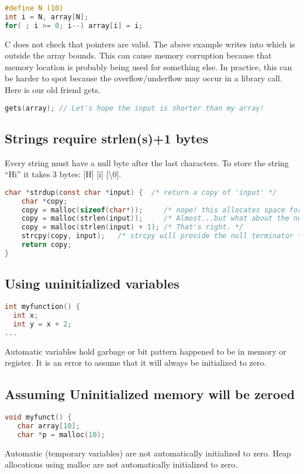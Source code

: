 \begin{lstlisting}[language=C]
#define N (10)
int i = N, array[N];
for( ; i >= 0; i--) array[i] = i;
\end{lstlisting}

C does not check that pointers are valid.
The above example writes into  which is outside the array bounds.
This can cause memory corruption because that memory location is probably being used for something else.
In practice, this can be harder to spot because the overflow/underflow may occur in a library call.
Here is our old friend gets.

\begin{lstlisting}[language=C]
gets(array); // Let's hope the input is shorter than my array!
\end{lstlisting}


\subsection{Strings require strlen(s)+1 bytes}

Every string must have a null byte after the last characters.
To store the string ``Hi'' it takes 3 bytes: [H] [i] [\backslash 0].

\begin{lstlisting}[language=C]
  char *strdup(const char *input) {  /* return a copy of 'input' */
    char *copy;
    copy = malloc(sizeof(char*));     /* nope! this allocates space for a pointer, not a string */
    copy = malloc(strlen(input));     /* Almost...but what about the null terminator? */
    copy = malloc(strlen(input) + 1); /* That's right. */
    strcpy(copy, input);   /* strcpy will provide the null terminator */
    return copy;
}
\end{lstlisting}

\subsection{Using uninitialized variables}

\begin{lstlisting}[language=C]
int myfunction() {
  int x;
  int y = x + 2;
...
\end{lstlisting}

Automatic variables hold garbage or bit pattern happened to be in memory or register.
It is an error to assume that it will always be initialized to zero.

\subsection{Assuming Uninitialized memory will be zeroed}

\begin{lstlisting}[language=C]
void myfunct() {
   char array[10];
   char *p = malloc(10);
\end{lstlisting}

Automatic (temporary variables) are not automatically initialized to zero.
Heap allocations using malloc are not automatically initialized to zero.
